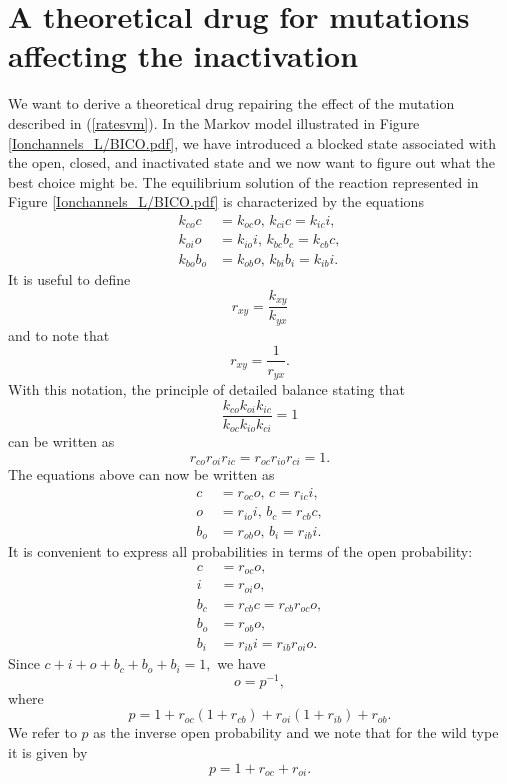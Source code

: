 \section[Drug for mutations of inactivation]{A theoretical drug for mutations affecting the inactivation}


We want to derive a theoretical drug repairing the effect of the mutation described in (\ref{ratesvm}). In the Markov model
illustrated in Figure  \ref{Ionchannels_L/BICO.pdf}, we have introduced a blocked state associated with the open, closed, and inactivated state and
we now want to figure out what the best choice might be.
The equilibrium solution of the reaction represented in Figure \ref{Ionchannels_L/BICO.pdf} is characterized by the equations%
\begin{align*}
k_{co}c &  =k_{oc}o,\, k_{ci}c   =k_{ic}i,\\
k_{oi}o &  =k_{io}i,\, k_{bc}b_{c}   =k_{cb}c,\\
k_{bo}b_{o} &  =k_{ob}o, \, k_{bi}b_{i}   =k_{ib}i.
\end{align*}
It is useful to define%
\[
r_{xy}=\frac{k_{xy}}{k_{yx}}%
\]
and to note that%
\[
r_{xy}=\frac{1}{r_{yx}}.
\]
With this notation, the principle of detailed balance stating that%
\[
\frac{k_{co}k_{oi}k_{ic}}{k_{oc}k_{io}k_{ci}}=1
\]
can be written as%
\[
r_{co}r_{oi}r_{ic}=r_{oc}r_{io}r_{ci}=1.
\]
The equations above can now be written as%
\begin{align*}
c &  =r_{oc}o,\, c   =r_{ic}i,\\
o &  =r_{io}i,\, b_{c}   =r_{cb}c,\\
b_{o} &  =r_{ob}o,\, b_{i}   =r_{ib}i.
\end{align*}
It is convenient to express all probabilities in terms of the open probability:%
\begin{align*}
c &  =r_{oc}o,\\
i &  =r_{oi}o,\\
b_{c} &  =r_{cb}c=r_{cb}r_{oc}o,\\
b_{o} &  =r_{ob}o,\\
b_{i} &  =r_{ib}i=r_{ib}r_{oi}o.
\end{align*}
Since $c+i+o+b_{c}+b_{o}+b_{i}=1,$ we have%
\[
o=p^{-1},%
\]
where%
\[
p    =1+r_{oc}\left(  1+r_{cb}\right)  +r_{oi}\left(  1+r_{ib}\right)  +r_{ob}.%
\]
We refer to $p$ as the inverse open probability and we note that for the wild type
it is given by%
\[
p=1+r_{oc}+r_{oi}.
\]

